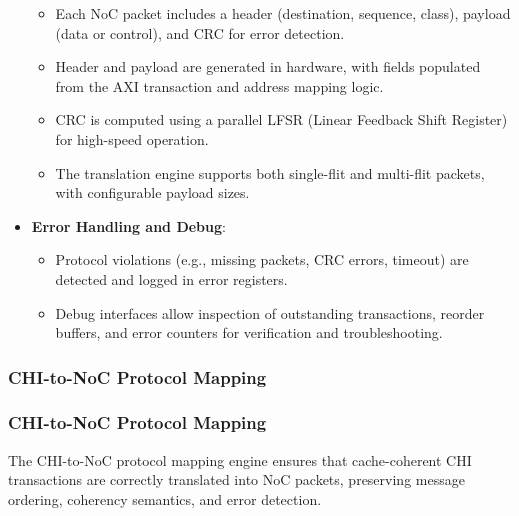\documentclass[11pt,a4paper]{article}
\begin{document}
\begin{itemize}
\begin{itemize}
        \item Each NoC packet includes a header (destination, sequence, class), payload (data or control), and CRC for error detection.
        \item Header and payload are generated in hardware, with fields populated from the AXI transaction and address mapping logic.
        \item CRC is computed using a parallel LFSR (Linear Feedback Shift Register) for high-speed operation.
        \item The translation engine supports both single-flit and multi-flit packets, with configurable payload sizes.
    \end{itemize}
    \item \textbf{Error Handling and Debug}:
    \begin{itemize}
        \item Protocol violations (e.g., missing packets, CRC errors, timeout) are detected and logged in error registers.
        \item Debug interfaces allow inspection of outstanding transactions, reorder buffers, and error counters for verification and troubleshooting.
    \end{itemize}
\end{itemize}

\subsubsection{CHI-to-NoC Protocol Mapping}

\subsubsection{CHI-to-NoC Protocol Mapping}

The CHI-to-NoC protocol mapping engine ensures that cache-coherent CHI transactions are correctly translated into NoC packets, preserving message ordering, coherency semantics, and error detection.
\end{document}
